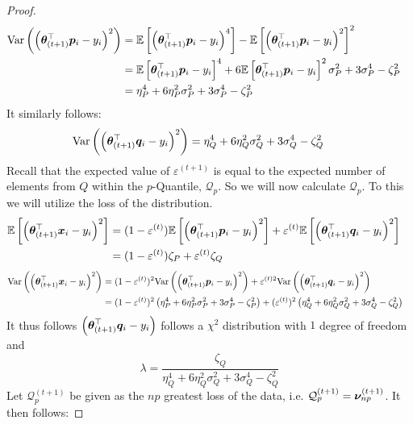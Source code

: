 \documentclass{article} %
\begin{document}
\begin{appendices}
\begin{proof}
		\begin{align*}
			\mathrm{Var}\left(\left({\bm{\theta}}_{(t+1)}^\top{\bm{p}}_i - y_i\right)^2\right)&= \mathbb{E}\left[\left({\bm{\theta}}_{(t+1)}^\top{\bm{p}}_i - y_i\right)^4\right] - \mathbb{E}\left[\left({\bm{\theta}}_{(t+1)}^\top{\bm{p}}_i - y_i\right)^2\right]^2 &&\\
			&= \mathbb{E}\left[{\bm{\theta}}_{(t+1)}^\top{\bm{p}}_i - y_i\right]^4 + 6 \mathbb{E}\left[{\bm{\theta}}_{(t+1)}^\top{\bm{p}}_i - y_i\right]^2\sigma_P^2 + 3\sigma_P^4 - \zeta_P^2&&\\
			&= \eta_P^4 + 6 \eta_P^2 \sigma_P^2 + 3\sigma_P^4 - \zeta_P^2 &&
		\end{align*}
		It similarly follows:
		\begin{align*}
			\mathrm{Var}\left(\left({\bm{\theta}}_{(t+1)}^\top{\bm{q}}_i - y_i\right)^2\right)&=\eta_Q^4 + 6 \eta_Q^2 \sigma_Q^2 + 3\sigma_Q^4 - \zeta_Q^2 &&
		\end{align*}
		Recall that the expected value of $\varepsilon^{(t+1)}$ is equal to the expected number of elements from $Q$ within the $p$-Quantile, $\mathcal{Q}_p$. So we will now calculate $\mathcal{Q}_p$. To this we will utilize the  loss of the distribution. 
		\begin{align*}
			\mathbb{E}\left[\left({\bm{\theta}}_{(t+1)}^\top {\bm{x}}_i - y_i\right)^2\right] &= (1-\varepsilon^{(t)})\mathbb{E}\left[\left({\bm{\theta}}_{(t+1)}^\top {\bm{p}}_i - y_i\right)^2\right] + \varepsilon^{(t)}\mathbb{E}\left[\left({\bm{\theta}}_{(t+1)}^\top {\bm{q}}_i - y_i\right)^2\right] &&\\
			&= (1-\varepsilon^{(t)})\zeta_P + \varepsilon^{(t)}\zeta_Q &&
		\end{align*}
		\begin{align*}
			\mathrm{Var}\left(\left({\bm{\theta}}_{(t+1)}^\top{\bm{x}}_i - y_i\right)^2\right) &= (1-\varepsilon^{(t)})^2\mathrm{Var}\left(\left({\bm{\theta}}_{(t+1)}^\top{\bm{p}}_i - y_i\right)^2\right) + \varepsilon^{(t)2}\mathrm{Var}\left(\left({\bm{\theta}}_{(t+1)}^\top{\bm{q}}_i - y_i\right)^2\right) &&\\
			&= (1-\varepsilon^{(t)})^2\left(\eta_P^4 + 6 \eta_P^2 \sigma_P^2 + 3\sigma_P^4 - \zeta_P^2\right) + (\varepsilon^{(t)})^2\left(\eta_Q^4 + 6 \eta_Q^2 \sigma_Q^2 + 3\sigma_Q^4 - \zeta_Q^2\right) &&
		\end{align*}
		It thus follows $\displaystyle \left({\bm{\theta}}_{(t+1)}^\top{\bm{q}}_i - y_i\right)$ follows a $\chi^2$ distribution with $1$ degree of freedom and \begin{equation*} \lambda = \frac{\zeta_Q}{\eta_Q^4 + 6 \eta_Q^2 \sigma_Q^2 + 3\sigma_Q^4 - \zeta_Q^2}\end{equation*}
		Let $\mathcal{Q}_p^{(t+1)}$ be given as the $np$ greatest loss of the data, i.e. $\mathcal{Q}_p^{(t+1)} = {\bm{\nu}}_{np}^{(t+1)}$. It then follows:

\end{proof}
\end{appendices}
\end{document}
